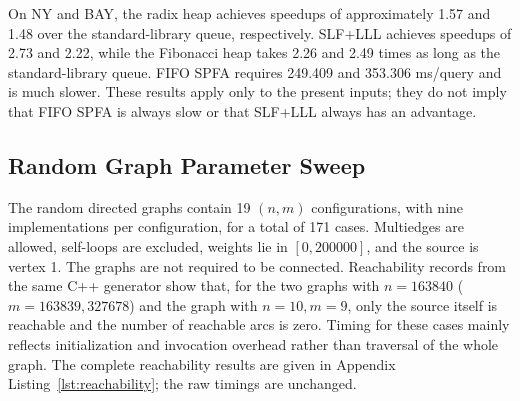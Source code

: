 \begin{table}[H]\centering\small
\caption{Mean wall-clock time per query. Speedup is the standard-library time divided by the time of the current implementation.}\label{tab:dimacs}

\end{table}
On NY and BAY, the radix heap achieves speedups of approximately 1.57 and 1.48 over
the standard-library queue, respectively. SLF+LLL achieves speedups of 2.73 and
2.22, while the Fibonacci heap takes 2.26 and 2.49 times as long as the
standard-library queue. FIFO SPFA requires 249.409 and 353.306 ms/query and is much
slower.
These results apply only to the present inputs; they do not imply that FIFO SPFA is
always slow or that SLF+LLL always has an advantage.
\FloatBarrier

\subsection{Random Graph Parameter Sweep}
The random directed graphs contain 19 $(n,m)$ configurations, with nine
implementations per configuration, for a total of 171 cases. Multiedges are allowed,
self-loops are excluded, weights lie in $[0,200000]$, and the source is vertex 1.
The graphs are not required to be connected. Reachability records from the same C++
generator show that, for the two graphs with $n=163840$
($m=163839,327678$) and the graph with $n=10,m=9$, only the source itself is
reachable and the number of reachable arcs is zero. Timing for these cases mainly
reflects initialization and invocation overhead rather than traversal of the whole
graph. The complete reachability results are given in Appendix
Listing~\ref{lst:reachability}; the raw timings are unchanged.

\begin{table}[H]\centering\small
\caption{Mean CPU time in ms for three representative random graphs. The corresponding arc counts are 327552, 327672, and 327676.}\label{tab:random}

\end{table}
\FloatBarrier


